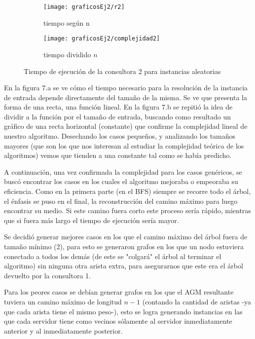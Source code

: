 \documentclass[A4paper,oneside,fleqn,11pt]{article}
\theoremstyle{definition}
\begin{document}
\begin{figure}[H] %
    \begin{subfigure}[b]{0.45\textwidth}
        \texttt{[image: graficosEj2/r2]}
        \caption[center]{tiempo según n}
        \label{ni se pa que sirve esto}
    \end{subfigure}
    \begin{subfigure}[b]{0.45\textwidth}
        \texttt{[image: graficosEj2/complejidad2]}
        \caption{tiempo dividido $n$}
        \label{ni se pa que sirve esto}
    \end{subfigure}
    \caption{Tiempo de ejecución de la consultora 2 para instancias aleatorias}
\end{figure}

En la figura 7.a se ve cómo el tiempo necesario para la resolución de la instancia de entrada depende directamente del tamaño de la misma. Se ve que presenta la forma de una recta, una función lineal. En la figura 7.b se repitió la idea de dividir a la función por el tamaño de entrada, buscando como resultado un gráfico de una recta horizontal (constante) que confirme la complejidad lineal de nuestro algoritmo. Desechando los casos pequeños, y analizando los tamaños mayores (que son los que nos interesan al estudiar la complejidad teórica de los algoritmos) vemos que tienden a una constante tal como se había predicho.

A continuación, una vez confirmada la complejidad para los casos genéricos, se buscó encontrar los casos en los cuales el algoritmo mejoraba o empeoraba su eficiencia. Como en la primera parte (en el BFS) siempre se recorre todo el árbol, el énfasis se puso en el final, la reconstrucción del camino máximo para luego encontrar su medio. Si este camino fuera corto este proceso sería rápido, mientras que si fuera más largo el tiempo de ejecución sería mayor.

Se decidió generar mejores casos en los que el camino máximo del árbol fuera de tamaño mínimo (2), para esto se generaron grafos en los que un nodo estuviera conectado a todos los demás (de este se "colgará" el árbol al terminar el algoritmo) sin ninguna otra arista extra, para asegurarnos que este era el árbol devuelto por la consultora 1.

Para los peores casos se debían generar grafos en los que el AGM resultante tuviera un camino máximo de longitud $n-1$ (contando la cantidad de aristas -ya que cada arista tiene el mismo peso-), esto se logra generando instancias en las que cada servidor tiene como vecinos sólamente al servidor inmediatamente anterior y al inmediatamente posterior.
\end{document}
